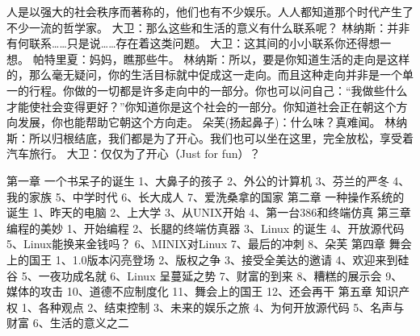\documentclass[12pt,UTF8]{ctexbook}
\begin{document}
人是以强大的社会秩序而著称的，他们也有不少娱乐。人人都知道那个时代产生了不少一流的哲学家。
大卫：那么这些和生活的意义有什么联系呢？
林纳斯：并非有何联系……只是说……存在着这类问题。
大卫：这其间的小小联系你还得想一想。
帕特里夏：妈妈，瞧那些牛。
林纳斯：所以，要是你知道生活的走向是这样的，那么毫无疑问，你的生活目标就中促成这一走向。而且这种走向并非是一个单一的行程。你做的一切都是许多走向中的一部分。你也可以问自己：“我做些什么才能使社会变得更好？”你知道你是这个社会的一部分。你知道社会正在朝这个方向发展，你也能帮助它朝这个方向走。
朵芙(扬起鼻子)：什么味？真难闻。
林纳斯：所以归根结底，我们都是为了开心。我们也可以坐在这里，完全放松，享受着汽车旅行。
大卫：仅仅为了开心（Just for fun）？

\mainmatter


第一章 一个书呆子的诞生
1、大鼻子的孩子
2、外公的计算机
3、芬兰的严冬
4、我的家族
5、中学时代
6、长大成人
7、爱洗桑拿的国家
第二章 一种操作系统的诞生
1、昨天的电脑
2、上大学
3、从UNIX开始
4、第一台386和终端仿真
第三章 编程的美妙
1、开始编程
2、长腿的终端仿真器
3、Linux 的诞生
4、开放源代码
5、Linux能换来金钱吗？
6、MINIX对Linux
7、最后的冲刺
8、朵芙
第四章 舞会上的国王
1、1.0版本闪亮登场
2、版权之争
3、接受全美达的邀请
4、欢迎来到硅谷
5、一夜功成名就
6、Linux 呈蔓延之势
7、财富的到来
8、糟糕的展示会
9、媒体的攻击
10、道德不应制度化
11、舞会上的国王
12、还会再干
第五章 知识产权
1、各种观点
2、结束控制
3、未来的娱乐之旅
4、为何开放源代码
5、名声与财富
6、生活的意义之二

\backmatter
\end{document}
